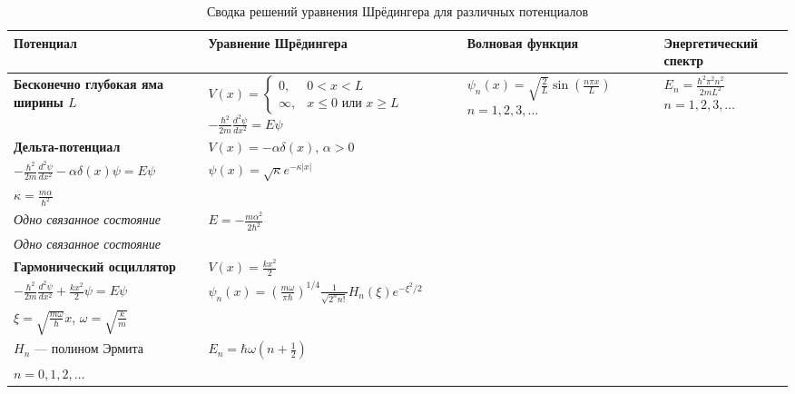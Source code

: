 \documentclass[a4paper, 12pt]{article}
\begin{document}
	 
	\begin{table}[h!]
		\centering
		\caption{Сводка решений уравнения Шрёдингера для различных потенциалов}
		\label{tab:potential_solutions}
		\begin{tabular}{>{\raggedright\arraybackslash}p{3.5cm} >{\raggedright\arraybackslash}p{4.5cm} >{\raggedright\arraybackslash}p{4.5cm} >{\raggedright\arraybackslash}p{4cm}}
			\toprule
			\textbf{Потенциал} &
			\textbf{Уравнение Шрёдингера} &
			\textbf{Волновая функция} &
			\textbf{Энергетический спектр} \\
			\midrule
			
			\textbf{Бесконечно глубокая яма ширины $L$}
			&
			$V(x) = \begin{cases}
				0, & 0 < x < L \\
				\infty, & x \leq 0 \text{ или } x \geq L
			\end{cases}$ 
			$-\frac{\hbar^2}{2m}\frac{d^2\psi}{dx^2} = E\psi$
			&
			$\psi_n(x) = \sqrt{\frac{2}{L}}\sin\left(\frac{n\pi x}{L}\right)$ 
			$n = 1, 2, 3, \ldots$ 
			&
			$E_n = \frac{\hbar^2\pi^2 n^2}{2mL^2}$ 
			$n = 1, 2, 3, \ldots$ \\
			\midrule
			
			\textbf{Дельта-потенциал}
			&
			$V(x) = -\alpha\delta(x)$, $\alpha > 0$ \\
			$-\frac{\hbar^2}{2m}\frac{d^2\psi}{dx^2} - \alpha\delta(x)\psi = E\psi$
			&
			$\psi(x) = \sqrt{\kappa}e^{-\kappa|x|}$ \\
			$\kappa = \frac{m\alpha}{\hbar^2}$ \\
			\textit{Одно связанное состояние}
			&
			$E = -\frac{m\alpha^2}{2\hbar^2}$ \\
			\textit{Одно связанное состояние} \\
			\midrule
			
			\textbf{Гармонический осциллятор}
			&
			$V(x) = \frac{kx^2}{2}$ \\
			$-\frac{\hbar^2}{2m}\frac{d^2\psi}{dx^2} + \frac{kx^2}{2}\psi = E\psi$
			&
			$\psi_n(x) = \left(\frac{m\omega}{\pi\hbar}\right)^{1/4}\frac{1}{\sqrt{2^n n!}}H_n(\xi)e^{-\xi^2/2}$ \\
			$\xi = \sqrt{\frac{m\omega}{\hbar}}x$, $\omega = \sqrt{\frac{k}{m}}$ \\
			$H_n$ — полином Эрмита
			&
			$E_n = \hbar\omega\left(n + \frac{1}{2}\right)$ \\
			$n = 0, 1, 2, \ldots$ \\
			\midrule
			

\end{tabular}
\end{table}
\end{document}
